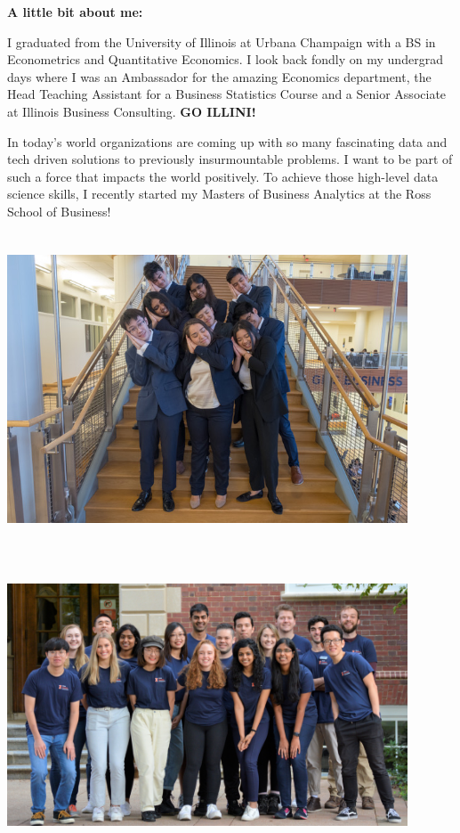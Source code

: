 \documentclass[
]{book}
\begin{document}
\textbf{A little bit about me:}

I graduated from the University of Illinois at Urbana Champaign with a BS in Econometrics and Quantitative Economics. I look back fondly on my undergrad days where I was an Ambassador for the amazing Economics department, the Head Teaching Assistant for a Business Statistics Course and a Senior Associate at Illinois Business Consulting. \textbf{GO ILLINI!}

In today's world organizations are coming up with so many fascinating data and tech driven solutions to previously insurmountable problems. I want to be part of such a force that impacts the world positively. To achieve those high-level data science skills, I recently started my Masters of Business Analytics at the Ross School of Business!

\includegraphics[width=4.6875in,height=3.64583in]{nikita3.jpeg} \includegraphics[width=4.6875in,height=3.64583in]{nikita2.png}
\end{document}
